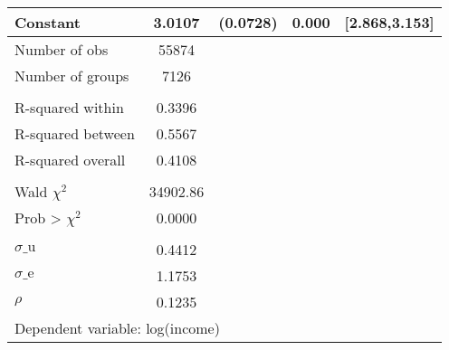 {\begin{tabular}{l*{1}{cccc}}
Constant            &      3.0107&    (0.0728)&       0.000&[2.868,3.153]\\
\midrule
Number of obs       &       55874&            &            &            \\
Number of groups    &        7126&            &            &            \\
\\ R-squared within &      0.3396&            &            &            \\
R-squared between   &      0.5567&            &            &            \\
R-squared overall   &      0.4108&            &            &            \\
\\ Wald $\chi^2$    &    34902.86&            &            &            \\
Prob > $\chi^2$     &      0.0000&            &            &            \\
\\ $\sigma\text{\_u}$&      0.4412&            &            &            \\
$\sigma\text{\_e}$   &      1.1753&            &            &            \\
$\rho$              &      0.1235&            &            &            \\
\bottomrule
\multicolumn{5}{l}{\footnotesize Dependent variable: log(income)}\\
\end{tabular}
}
